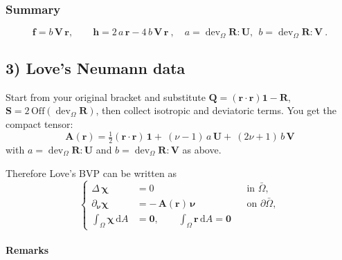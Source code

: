 \subsubsection{Summary}\label{summary}

\[
\boxed{\ \mathbf{f}=b\,{\mathbf{V}}\,\bm{r},\qquad
\mathbf{h}=2\,a\,\bm{r}-4\,b\,{\mathbf{V}}\,\bm{r}\ ,\quad
a=\operatorname{dev}_{\Omega}\bm{R}:{\mathbf{U}},\ \ b=\operatorname{dev}_{\Omega}\bm{R}:{\mathbf{V}}\ .\ }
\]




\subsection{3) Love's Neumann data}\label{loves-neumann-data}

Start from your original bracket and substitute
\(\mathbf{Q}=(\bm{r}\cdot\bm{r})\mathbf{1}-\bm{R}\),
\(\mathbf{S}=2\,\mathrm{Off}(\operatorname{dev}_{\Omega}\bm{R})\), then collect
isotropic and deviatoric terms. You get the compact tensor: \[
\boxed{
\mathbf{A}(\bm{r})
=\tfrac{1}{2}(\bm{r}\cdot\bm{r})\,\mathbf{1}
+\ (\nu-1)\,a\,{\mathbf{U}}
+\ (2\nu+1)\,b\,{\mathbf{V}}}
\] with
\(a=\operatorname{dev}_{\Omega}\bm{R}:{\mathbf{U}}\) and \(b=\operatorname{dev}_{\Omega}\bm{R}:{\mathbf{V}}\)
as above.

Therefore Love's BVP can be written as \[
\boxed{
\left\{
\begin{aligned}
\Delta\,\boldsymbol{\chi}&=0 &&\text{in }\bar\Omega,\\[2pt]
\partial_{\bm{\nu}}\boldsymbol{\chi}&= -\,\mathbf{A}(\bm{r})\,\bm{\nu}
&&\text{on }\partial\bar\Omega,\\[2pt]
\displaystyle\int_{\Omega}\boldsymbol{\chi}\,\mathrm{d}A&=\mathbf{0},\qquad
\int_{\Omega}\bm{r}\,\mathrm{d} A=\mathbf{0}
\end{aligned}
\right.}
\]

\paragraph{Remarks}\label{two-equivalent-minimalist-rewrites-you-might-like}

